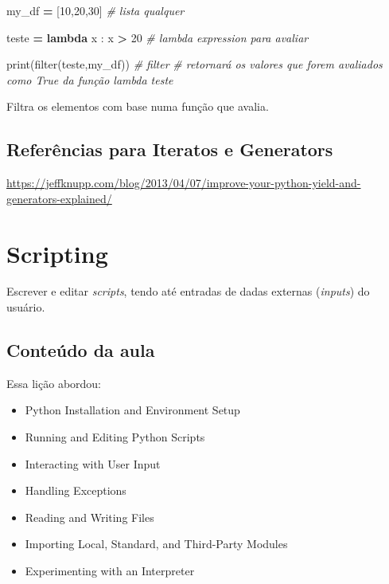 \documentclass[]{book}
\newenvironment{Shaded}{\begin{snugshade}}{\end{snugshade}}
\newcommand{\KeywordTok}[1]{\textcolor[rgb]{0.13,0.29,0.53}{\textbf{#1}}}
\newcommand{\DecValTok}[1]{\textcolor[rgb]{0.00,0.00,0.81}{#1}}
\newcommand{\CommentTok}[1]{\textcolor[rgb]{0.56,0.35,0.01}{\textit{#1}}}
\newcommand{\OperatorTok}[1]{\textcolor[rgb]{0.81,0.36,0.00}{\textbf{#1}}}
\newcommand{\BuiltInTok}[1]{#1}
\newcommand{\NormalTok}[1]{#1}
\providecommand{\tightlist}{%
  \setlength{\itemsep}{0pt}\setlength{\parskip}{0pt}}
\begin{document}
\begin{Shaded}
\begin{Highlighting}[]
\NormalTok{my_df }\OperatorTok{=}\NormalTok{ [}\DecValTok{10}\NormalTok{,}\DecValTok{20}\NormalTok{,}\DecValTok{30}\NormalTok{] }\CommentTok{# lista qualquer}

\NormalTok{teste }\OperatorTok{=} \KeywordTok{lambda}\NormalTok{ x : x }\OperatorTok{>} \DecValTok{20} \CommentTok{# lambda expression para avaliar}

\BuiltInTok{print}\NormalTok{(}\BuiltInTok{filter}\NormalTok{(teste,my_df)) }\CommentTok{# filter}
                           \CommentTok{# retornará os valores que forem avaliados como True da função lambda teste}
\end{Highlighting}
\end{Shaded}

Filtra os elementos com base numa função que avalia.

\subsection{Referências para Iteratos e
Generators}\label{referencias-para-iteratos-e-generators}

\url{https://jeffknupp.com/blog/2013/04/07/improve-your-python-yield-and-generators-explained/}

\section{Scripting}\label{scripting}

Escrever e editar \emph{scripts}, tendo até entradas de dadas externas
(\emph{inputs}) do usuário.

\subsection{Conteúdo da aula}\label{conteudo-da-aula-1}

Essa lição abordou:

\begin{itemize}
\tightlist
\item
  Python Installation and Environment Setup
\item
  Running and Editing Python Scripts
\item
  Interacting with User Input
\item
  Handling Exceptions
\item
  Reading and Writing Files
\item
  Importing Local, Standard, and Third-Party Modules
\item
  Experimenting with an Interpreter
\end{itemize}
\end{document}
